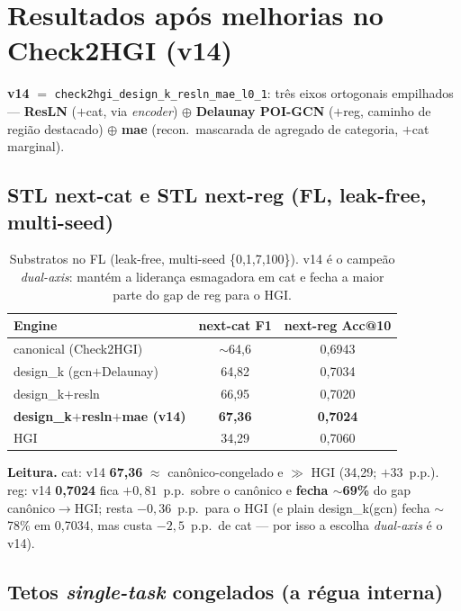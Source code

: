 \documentclass[11pt,a4paper]{article}
\newcommand{\good}[1]{\textcolor{green!45!black}{\textbf{#1}}}
\begin{document}
\section{Resultados após melhorias no Check2HGI (v14)}\label{sec:v14}

\textbf{v14} $=$ \texttt{check2hgi\_design\_k\_resln\_mae\_l0\_1}: três eixos ortogonais empilhados ---
\textbf{ResLN} ($+$cat, via \textit{encoder}) $\oplus$ \textbf{Delaunay POI-GCN} ($+$reg, caminho de
região destacado) $\oplus$ \textbf{mae} (recon.\ mascarada de agregado de categoria, $+$cat marginal).

\subsection{STL next-cat e STL next-reg (FL, leak-free, multi-seed)}

\begin{table}[H]
\centering
\footnotesize
\caption{Substratos no FL (leak-free, multi-seed \{0,1,7,100\}). v14 é o campeão \emph{dual-axis}:
mantém a liderança esmagadora em cat e fecha a maior parte do gap de reg para o HGI.}
\begin{tabular}{lcc}
\toprule
\textbf{Engine} & \textbf{next-cat F1} & \textbf{next-reg Acc@10} \\
\midrule
canonical (Check2HGI) & $\sim$64,6 & 0,6943 \\
design\_k (gcn$+$Delaunay) & 64,82 & 0,7034 \\
design\_k$+$resln & 66,95 & 0,7020 \\
\textbf{design\_k$+$resln$+$mae (v14)} & \good{67,36} & \good{0,7024} \\
HGI & 34,29 & 0,7060 \\
\bottomrule
\end{tabular}
\end{table}

\noindent\textbf{Leitura.} cat: v14 \good{67,36} $\approx$ canônico-congelado e $\gg$ HGI (34,29;
$+33$~p.p.). reg: v14 \good{0,7024} fica $+0{,}81$~p.p.\ sobre o canônico e \textbf{fecha $\sim$69\%}
do gap canônico$\to$HGI; resta $-0{,}36$~p.p.\ para o HGI (e plain design\_k(gcn) fecha $\sim$78\% em
0,7034, mas custa $-2{,}5$~p.p.\ de cat --- por isso a escolha \textit{dual-axis} é o v14).

\subsection{Tetos \textit{single-task} congelados (a régua interna)}\label{sec:tetos}
\end{document}
